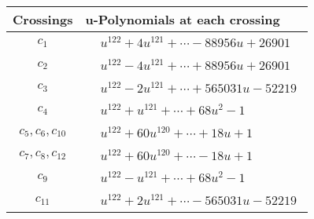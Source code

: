 \documentclass[1p]{elsarticle_modified}
\theoremstyle{definition}
\begin{document}
\begin{tabular}{m{50pt}|m{274pt}}
Crossings & \hspace{64pt}u-Polynomials at each crossing \\
\hline $$\begin{aligned}c_{1}\end{aligned}$$&$\begin{aligned}
&u^{122}+4 u^{121}+\cdots-88956 u+26901
\end{aligned}$\\
\hline $$\begin{aligned}c_{2}\end{aligned}$$&$\begin{aligned}
&u^{122}-4 u^{121}+\cdots+88956 u+26901
\end{aligned}$\\
\hline $$\begin{aligned}c_{3}\end{aligned}$$&$\begin{aligned}
&u^{122}-2 u^{121}+\cdots+565031 u-52219
\end{aligned}$\\
\hline $$\begin{aligned}c_{4}\end{aligned}$$&$\begin{aligned}
&u^{122}+u^{121}+\cdots+68 u^2-1
\end{aligned}$\\
\hline $$\begin{aligned}c_{5},c_{6},c_{10}\end{aligned}$$&$\begin{aligned}
&u^{122}+60 u^{120}+\cdots+18 u+1
\end{aligned}$\\
\hline $$\begin{aligned}c_{7},c_{8},c_{12}\end{aligned}$$&$\begin{aligned}
&u^{122}+60 u^{120}+\cdots-18 u+1
\end{aligned}$\\
\hline $$\begin{aligned}c_{9}\end{aligned}$$&$\begin{aligned}
&u^{122}- u^{121}+\cdots+68 u^2-1
\end{aligned}$\\
\hline $$\begin{aligned}c_{11}\end{aligned}$$&$\begin{aligned}
&u^{122}+2 u^{121}+\cdots-565031 u-52219
\end{aligned}$\\
\hline
\end{tabular}\\~\\
\end{document}
